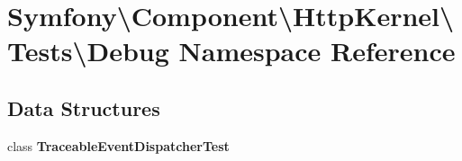 \section{Symfony\textbackslash{}Component\textbackslash{}Http\+Kernel\textbackslash{}Tests\textbackslash{}Debug Namespace Reference}
\label{namespace_symfony_1_1_component_1_1_http_kernel_1_1_tests_1_1_debug}
\subsection*{Data Structures}
\begin{DoxyCompactItemize}
\item 
class {\bf Traceable\+Event\+Dispatcher\+Test}
\end{DoxyCompactItemize}
